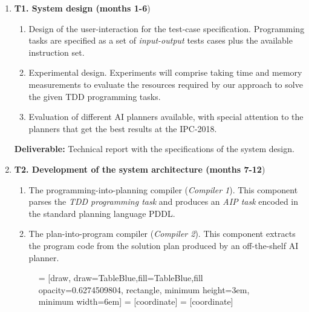 \documentclass[10pt,a4paper]{paper}
\begin{document}
\begin{enumerate}
\item {\bf T1. System design (months 1-6})
  \begin{small}
    \begin{enumerate}
    \item Design of the user-interaction for the test-case specification. Programming tasks are specified as a set of {\em input-output} tests cases plus the available instruction set. 
    \item Experimental design. Experiments will comprise taking time and memory measurements to evaluate the resources required by our approach to solve the given TDD programming tasks.
      \item Evaluation of different AI planners available, with special attention to the planners that get the best results at the IPC-2018. 
      \end{enumerate}
  \end{small}

{\small {\bf Deliverable:} Technical report with the specifications of the system design.}
  
  \item {\bf T2. Development of the system architecture (months 7-12})
    \begin{small}
      \begin{enumerate}
      \item The programming-into-planning compiler ({\em Compiler 1}). This component parses the {\em TDD programming task} and produces an {\em AIP task} encoded in the standard planning language PDDL.
      \item The plan-into-program compiler ({\em Compiler 2}). This component extracts the program code from the solution plan produced by an off-the-shelf AI planner.
      \end{enumerate}
\end{small}      

\begin{figure}[hbt!]
 = [draw, draw=TableBlue,fill=TableBlue,fill opacity=0.6274509804, rectangle, minimum height=3em, minimum width=6em]
 = [coordinate]
 = [coordinate]
\begin{center}
\end{center}
\end{figure}
\end{enumerate}
\end{document}
